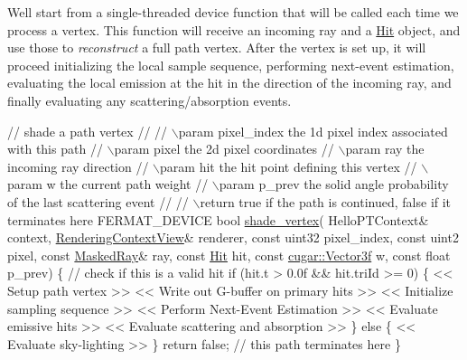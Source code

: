 \begin{DoxyParagraph}{}
We\textquotesingle{}ll start from a single-\/threaded device function that will be called each time we process a vertex. This function will receive an incoming ray and a \hyperlink{struct_hit}{Hit} object, and use those to {\itshape reconstruct} a full path vertex. After the vertex is set up, it will proceed initializing the local sample sequence, performing next-\/event estimation, evaluating the local emission at the hit in the direction of the incoming ray, and finally evaluating any scattering/absorption events. \label{_hello_renderer_page_shade_vertex_anchor}%
%
 ~\newline

\begin{DoxyCode}
\textcolor{comment}{// shade a path vertex}
\textcolor{comment}{//}
\textcolor{comment}{// \(\backslash\)param pixel\_index       the 1d pixel index associated with this path}
\textcolor{comment}{// \(\backslash\)param pixel             the 2d pixel coordinates}
\textcolor{comment}{// \(\backslash\)param ray               the incoming ray direction}
\textcolor{comment}{// \(\backslash\)param hit               the hit point defining this vertex}
\textcolor{comment}{// \(\backslash\)param w                 the current path weight}
\textcolor{comment}{// \(\backslash\)param p\_prev            the solid angle probability of the last scattering event}
\textcolor{comment}{//}
\textcolor{comment}{// \(\backslash\)return                  true if the path is continued, false if it terminates here}
FERMAT\_DEVICE
\textcolor{keywordtype}{bool} \hyperlink{group___p_t_lib_core_ga9b8be237ade285e6db792a9ea7bf900e}{shade\_vertex}(
 HelloPTContext&         context,
 \hyperlink{struct_rendering_context_view}{RenderingContextView}&   renderer,
 \textcolor{keyword}{const} uint32            pixel\_index,
 \textcolor{keyword}{const} uint2             pixel,
 \textcolor{keyword}{const} \hyperlink{struct_masked_ray}{MaskedRay}&        ray,
 \textcolor{keyword}{const} \hyperlink{struct_hit}{Hit}               hit,
 \textcolor{keyword}{const} \hyperlink{structcugar_1_1_vector}{cugar::Vector3f}   w,
 \textcolor{keyword}{const} \textcolor{keywordtype}{float}             p\_prev)
\{
    \textcolor{comment}{// check if this is a valid hit}
    \textcolor{keywordflow}{if} (hit.t > 0.0f && hit.triId >= 0)
    \{
        << Setup path vertex >>
        << Write out G-buffer on primary hits >>
        << Initialize sampling sequence >>
        << Perform Next-Event Estimation >>
        << Evaluate emissive hits >>
        << Evaluate scattering and absorption >>
    \}
    \textcolor{keywordflow}{else}
    \{
        << Evaluate sky-lighting >>
    \}
    \textcolor{keywordflow}{return} \textcolor{keyword}{false}; \textcolor{comment}{// this path terminates here}
\}
\end{DoxyCode}

\end{DoxyParagraph}
